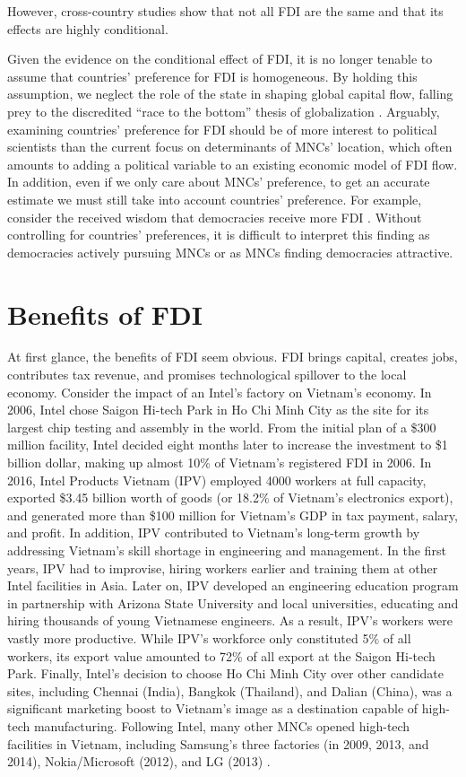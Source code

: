 However, cross-country studies show that not all FDI are the same and that its effects are highly conditional. 

Given the evidence on the conditional effect of FDI, it is no longer tenable to
assume that countries' preference for FDI is homogeneous. By holding this
assumption, we neglect the role of the state in shaping global capital flow,
falling prey to the discredited ``race to the bottom'' thesis of globalization
\citep{Mosley2005}. Arguably, examining countries' preference for FDI should be
of more interest to political scientists than the current focus on determinants
of MNCs' location, which often amounts to adding a political variable to an
existing economic model of FDI flow. In addition, even if we only care about
MNCs' preference, to get an accurate estimate we must still take into account
countries' preference. For example, consider the received wisdom that
democracies receive more FDI \citep{Jensen2008a}. Without controlling for
countries' preferences, it is difficult to interpret this finding as democracies
actively pursuing MNCs or as MNCs finding democracies attractive.

\section{Benefits of FDI}

At first glance, the benefits of FDI seem obvious. FDI brings capital, creates
jobs, contributes tax revenue, and promises technological spillover to the local
economy. Consider the impact of an Intel's factory on Vietnam's economy. In
2006, Intel chose Saigon Hi-tech Park in Ho Chi Minh City as the site for its
largest chip testing and assembly in the world. From the initial plan of a \$300
million facility, Intel decided eight months later to increase the investment to
\$1 billion dollar, making up almost 10\% of Vietnam's registered FDI in 2006.
In 2016, Intel Products Vietnam (IPV) employed 4000 workers at full capacity,
exported \$3.45 billion worth of goods (or 18.2\% of Vietnam's electronics
export), and generated more than \$100 million for Vietnam's GDP in tax payment,
salary, and profit. In addition, IPV contributed to Vietnam's long-term
growth by addressing Vietnam's skill shortage in engineering and management. In
the first years, IPV had to improvise, hiring workers earlier and training them
at other Intel facilities in Asia. Later on, IPV developed an engineering
education program in partnership with Arizona State University and local
universities, educating and hiring thousands of young Vietnamese engineers. As a
result, IPV's workers were vastly more productive. While IPV's workforce only
constituted 5\% of all workers, its export value amounted to 72\% of all export
at the Saigon Hi-tech Park. Finally, Intel's decision to choose Ho Chi Minh City
over other candidate sites, including Chennai (India), Bangkok (Thailand), and
Dalian (China), was a significant marketing boost to Vietnam's image as a
destination capable of high-tech manufacturing. Following Intel, many other MNCs
opened high-tech facilities in Vietnam, including Samsung's three factories (in
2009, 2013, and 2014), Nokia/Microsoft (2012), and LG (2013) \citep{Dinh2016,
  UNCTAD2008}.

